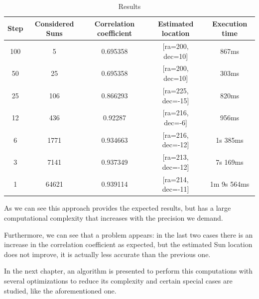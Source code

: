 \begin{table}[h!]
	\centering
	\def\arraystretch{1.2}
	\begin{tabular}{|c c c c c|} 
		\hline
		Step & Considered Suns & Correlation coefficient & Estimated location & Execution time \\ [0.5ex] 
		\hline\hline
		100 & 5 & 0.695358 & [ra=200, dec=10] & 867ms \\
		\hline 
		50 & 25 & 0.695358 & [ra=200, dec=10] & 303ms \\
			\hline 
		25 & 106 & 0.866293 & [ra=225, dec=-15] & 820ms \\
			\hline 
		12 & 436 & 0.92287 & [ra=216, dec=-6] & 956ms \\
			\hline 
		6 & 1771 & 0.934663 & [ra=216, dec=-12] & 1s 385ms \\
			\hline 
		3 & 7141 & 0.937349 & [ra=213, dec=-12] & 7s 169ms \\
			\hline 
		1 & 64621 & 0.939114 & [ra=214, dec=-11] & 1m 9s 564ms \\
		\hline 
		\hline 
	\end{tabular}
	\caption{Results}
\end{table}

As we can see this approach provides the expected results, but has a large computational complexity that increases with the precision we demand. 

Furthermore, we can see that a problem appears: in the last two cases there is an increase in the correlation coefficient as expected, but the estimated Sun location does not improve, it is actually less accurate than the previous one.

In the next chapter, an algorithm is presented to perform this computations with several optimizations to reduce its complexity and certain special cases are studied, like the aforementioned one.